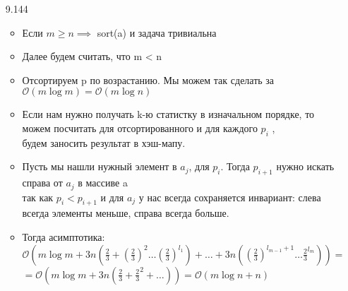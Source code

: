 \documentclass{article}
\begin{document}
\begin{enumerate}
    \item [9.144]
    \begin{itemize}
        \item Если $m \geq n \implies$ sort(a) и задача тривиальна
        \item Далее будем считать, что m < n
        \item Отсортируем p по возрастанию. Мы можем так сделать за $\mathcal{O}(m \log{m}) = \mathcal{O}(m \log{n} )$
        \item Если нам нужно получать k-ю статистку в изначальном порядке, то можем посчитать для отсортированного и для каждого $p_i$ , \\
        будем заносить результат в хэш-мапу.
        \item Пусть мы нашли нужный элемент в $a_j$, для $p_i$. Тогда $p_{i+1}$ нужно искать справа от $a_j$ в массиве a \\
        так как $p_i < p_{i+1}$ и для $a_j$ у нас всегда сохраняется инвариант: слева всегда элементы меньше, справа всегда больше. \\
        \item Тогда асимптотика: $\mathcal{O}(m \log{m} + 3n(\frac{2}{3} + (\frac{2}{3})^2 \dots (\frac{2}{3})^{l_1}) + \dots + 3n((\frac{2}{3})^{l_{m-1} + 1}\dots \frac{2}{3}^{l_m})) = $ \\
        $= \mathcal{O}(m \log{m} + 3n (\frac{2}{3} + \frac{2}{3}^2 + \dots)) = \mathcal{O}(m \log{n} + n)$
    \end{itemize}


\end{enumerate}
\end{document}
